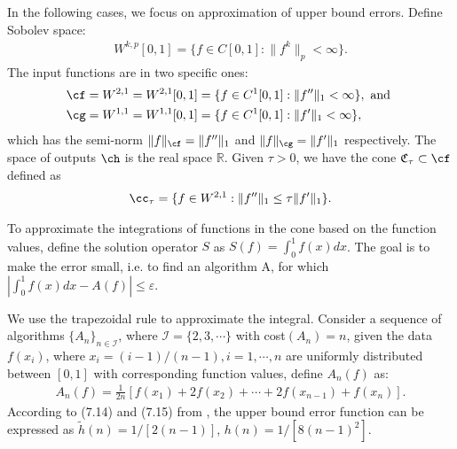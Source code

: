 
\newcommand{\R}{\mathbb{R}}
In the following cases, we focus on approximation of upper bound errors. Define Sobolev space:
\begin{align*}
  W^{k,p}[0,1]=\{f\in C[0,1]: \|f^{k}\|_{p}<\infty\}.
\end{align*}
The input functions are in two specific ones:
\begin{align*}
  \cf&=W^{2,1}=W^{2,1}[0,1]=\{f\in C^1[0,1]: \|f''\|_1<\infty\}, \text{ and }\\
  \cg&=W^{1,1}=W^{1,1}[0,1]=\{f\in C^1[0,1]: \|f'\|_1<\infty\},
\end{align*}
which has the semi-norm $\|f\|_{\cf}=\|f''\|_{1}$ and $\|f\|_{\cg}=\|f'\|_{1}$ respectively. The space of outputs $\ch$ is the real space $\R$. Given $\tau > 0$, we have the cone $\mathfrak{C}_{\tau} \subset \cf$ defined as
\begin{align}\label{coneinteg}
\cc_{\tau}=\{f\in W^{2,1}:\|f''\|_1\leq\tau\|f'\|_1\}.
\end{align}

To approximate the integrations of functions in the cone based on the function values, define the solution operator $S$ as $S(f)=\int_{0}^{1}f(x)dx$. The goal is to make the error small, i.e. to find an algorithm A, for which $|\int_{0}^{1}f(x)dx-A(f)|\leq \varepsilon$.

We use the trapezoidal rule to approximate the integral. Consider a sequence of algorithms $\{A_n\}_{n\in \mathcal{I}}$, where $\mathcal{I}=\{2,3,\cdots\}$ with cost$(A_n)=n$, given the data $f(x_i)$, where $x_i=(i-1)/(n-1), i=1,\cdots,n$ are uniformly distributed between $[0,1]$ with corresponding function values, define $A_n(f)$ as: \begin{align*}
    A_{n}(f)%
    =\frac{1}{2n}[f(x_1)+2f(x_2)+\cdots+2f(x_{n-1})+f(x_n)].
\end{align*}
According to (7.14) and (7.15) from \cite{BraPet11a}, the upper bound error function can be expressed as $\tilde{h}(n)=1/[2(n-1)]$, $h(n)=1/[8(n-1)^2]$.
%
%
